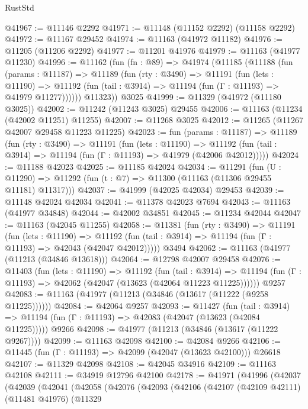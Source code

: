\begin{lexlean}{RustStd}
\begin{coremodule}
@41967 := @11146 @2292
@41971 := @11148 (@11152 @2292) (@11158 @2292)
@41972 := @11167 @29452
@41974 := @11163 (@41972 @11182)
@41976 := @11205 (@11206 @2292)
@41977 := @11201 @41976
@41979 := @11163 (@41977 @11230)
@41996 := @11162
    (fun (fn : @89) =>
    @41974
      (@11185
        (@11188
          (fun (params : @11187) =>
          @11189
            (fun (rty : @3490) =>
            @11191
              (fun (lets : @11190) =>
              @11192 (fun (tail : @3914) => @11194 (fun (Γ : @11193) => @41979 @11277))))))
        @11323))
    @3025
@41999 := @11329 (@41972 (@11180 @3025))
@42002 := @11242 (@11243 @3025) @29455
@42006 := @11163 (@11234 (@42002 @11251) @11255)
@42007 := @11268 @3025
@42012 := @11265 (@11267 @42007 @29458 @11223 @11225)
@42023 := fun (params : @11187) =>
  @11189
    (fun (rty : @3490) =>
    @11191
      (fun (lets : @11190) =>
      @11192 (fun (tail : @3914) => @11194 (fun (Γ : @11193) => @41979 (@42006 @42012)))))
@42024 := @11188 @42023
@42025 := @11185 @42024
@42034 := @11291
    (fun (U : @11290) => @11292 (fun (t : @7) => @11300 (@11163 (@11306 @29455 @11181) @11317)))
@42037 := @41999 (@42025 @42034) @29453
@42039 := @11148 @42024 @42034
@42041 := @11378 @42023 @7694
@42043 := @11163 (@41977 @34848)
@42044 := @42002 @34851
@42045 := @11234 @42044
@42047 := @11163 (@42045 @11255)
@42058 := @11381
    (fun (rty : @3490) =>
    @11191
      (fun (lets : @11190) =>
      @11192 (fun (tail : @3914) => @11194 (fun (Γ : @11193) => @42043 (@42047 @42012)))))
    @3494
@42062 := @11163 (@41977 (@11213 (@34846 @13618)))
@42064 := @12798 @42007 @29458
@42076 := @11403
    (fun (lets : @11190) =>
    @11192
      (fun (tail : @3914) =>
      @11194 (fun (Γ : @11193) => @42062 (@42047 (@13623 (@42064 @11223 @11225))))))
    @9257
@42083 := @11163 (@41977 (@11213 (@34846 (@13617 (@11222 (@9258 @11225))))))
@42084 := @42064 @9257
@42093 := @11427
    (fun (tail : @3914) => @11194 (fun (Γ : @11193) => @42083 (@42047 (@13623 (@42084 @11225)))))
    @9266
@42098 := @41977 (@11213 (@34846 (@13617 (@11222 @9267))))
@42099 := @11163 @42098
@42100 := @42084 @9266
@42106 := @11445 (fun (Γ : @11193) => @42099 (@42047 (@13623 @42100))) @26618
@42107 := @11329 @42098
@42108 := @42045 @34916
@42109 := @11163 @42108
@42111 := @34919 @12796 @42100
@42178 := @41971
    (@41996
      (@42037
        (@42039
          (@42041
            (@42058
              (@42076
                (@42093
                  (@42106
                    (@42107
                      (@42109 @42111)
                      (@11481 @41976)
                      (@11329

\end{coremodule}
\end{lexlean}
